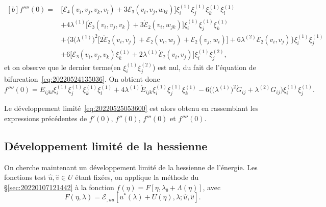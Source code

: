 \documentclass[12pt, final]{scrartcl}
\theoremstyle{definition}
\newcommand{\order}[2][1]{#2^{(#1)}}
\begin{document}
\begin{equation*}
  \begin{aligned}[b]
    f''''(0)
    ={} & \bigl[ ℰ₄(v_i, v_j, v_k , v_l) + 3ℰ₃(v_i, v_j, w_{k l}) \bigr] \order[1]{ξ_i} \order[1]{ξ_j} \order[1]{ξ_k} \order[1]{ξ_l}\\
    & + 4 \order[1]λ \bigl[\dot{ℰ}₃(v_i, v_j, v_k) + 3 \dot{ℰ}₂(v_i, w_{j k})\bigr] \order[1]{ξ_i} \order[1]{ξ_j} \order[1]{ξ_k}\\
    & + \bigl\{3 \bigl( \order[1]λ \bigr)^2 \bigl[ 2\ddot{ℰ}₂ (v_i, v_j) + \dot{ℰ}₂(v_i, w_j) + \dot{ℰ}₂(v_j, w_i) \bigr] + 6\order[2]λ \dot{ℰ}₂(v_i, v_j) \bigr\} \order[1]{ξ_i} \order[1]{ξ_j}\\
    & + 6\bigl[ℰ₃(v_i, v_j, v_k) \order[1]{ξ_k} + 2 \order[1]λ \dot{ℰ}₂(v_i, v_j)\bigr] \order[1]{ξ_i} \order[2]{ξ_j},
  \end{aligned}
\end{equation*}
et on observe que le dernier terme(en \(\order[1]{ξ_i} \order[2]{ξ_j}\)) est nul, du fait de
l'équation de bifurcation~\eqref{eq:20220524135036}. On obtient donc
\begin{equation}
  \label{eq:20220601055512}
  f''''(0) = E_{i j k l} \order[1]{ξ_i} \order[1]{ξ_j} \order[1]{ξ_k} \order[1]{ξ_l} + 4 \order[1]λ \mathring{E}_{i j k} \order[1]{ξ_i} \order[1]{ξ_j} \order[1]{ξ_k} - 6 \bigl(\bigl( \order[1]λ \bigr)^2 \mathring{G}_{i j} + \order[2]λ G_{i j}\bigr) \order[1]{ξ_i} \order[1]{ξ_j} .
\end{equation}

Le développement limité~\eqref{eq:20220525053600} est alors obtenu en
rassemblant les expressions précédentes de \(f'(0)\), \(f''(0)\), \(f'''(0)\) et
\(f''''(0)\).

\subsection{Développement limité de la hessienne}
\label{sec:20220616055207}
%

On cherche maintenant un développement limité de la hessienne de l'énergie. Les
fonctions test \(\hat{u}, \hat{v} ∈ U\) étant fixées, on applique la méthode du
\S\ref{sec:20220107121442} à la fonction \(f(η) = F [η, λ₀ + Λ(η)]\), avec
\begin{equation*}
  F(η, λ) = ℰ_{, u u} [u^{\ast}(λ) + U(η), λ; \hat{u}, \hat{v}].
\end{equation*}
\end{document}
